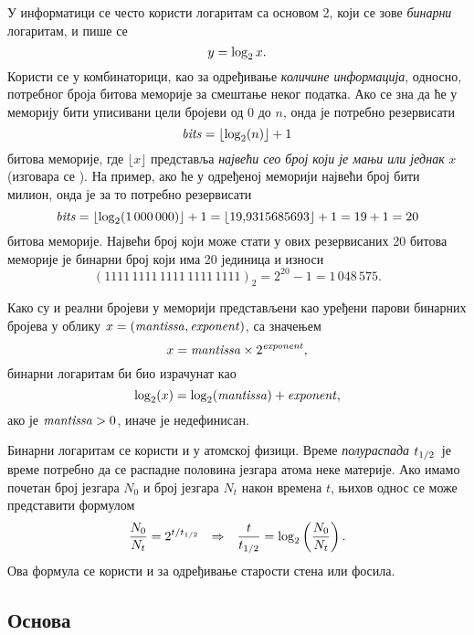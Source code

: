 \def\lb{\mathop{\rm lb}}
\def\bits{{\it bits}}
\def\mant{\textit{mantissa\/}}%
\def\expo{\textit{exponent\/}}%
\def\znak{{\it знак}}%

У информатици се често користи логаритам са основом 2, који се зове
{\sl бинарни\/} логаритам, и пише се
$$
y=\log_2 x.
$$
Користи се у комбинаторици, као за одређивање {\sl количине информација},
односно, потребног броја битова меморије за смештање неког податка.
Ако се зна да ће у меморију бити уписивани цели бројеви од
0 до $n$, онда је потребно резервисати
\begin{equation}\label{eq:bits}
  \bits = \lfloor\logtwo(n)\rfloor+1
\end{equation}
битова меморије, где $\lfloor x\rfloor$ 
представља {\sl највећи сео број који је мањи или једнак} $x$
(изговара се ).
На пример, ако ће у одређеној меморији највећи  
број бити милион, онда је за то потребно резервисати
$$
\bits=\lfloor\logtwo(1\,000\,000)\rfloor+1=\lfloor 19\.9315685693\rfloor+1 = 19+1=20
$$
битова меморије.
Највећи број који може стати у ових резервисаних 20 битова меморије је бинарни број који има 20 јединица 
и износи 
$$
(1111\,1111\,1111\,1111\,1111)_2=
2^{20}-1=1\,048\,575.
$$

Како су и реални бројеви у меморији представљени као уређени парови бинарних бројева у облику
$x=(\mant,\expo)$, са значењем
$$
x=\mant\puta2^\expo,
$$
бинарни логаритам би био израчунат као
$$
\logtwo(x)=\logtwo(\mant)+\expo,
$$
ако је $\mant>0$, иначе је недефинисан.

\smallskip

Бинарни логаритам се користи и у атомској физици.
Време {\sl полураспада\/} $t_{1/2}$\
је време потребно да се распадне половина језгара атома неке материје.
Ако имамо почетан број језгара
$N_0$ и број језгара $N_t$ након времена $t$, њихов однос
се може представити формулом
\begin{equation}
\label{eq:halftime}
\frac{N_0}{N_t}=2^{t/t_{1/2}}{\quad\Rightarrow\quad} \frac{t}{t_{1/2}}=\log_2\left( \frac{N_0}{N_t} \right).
\end{equation}
Ова формула се користи и за одређивање старости стена или фосила.



\subsection{Основа \e}

